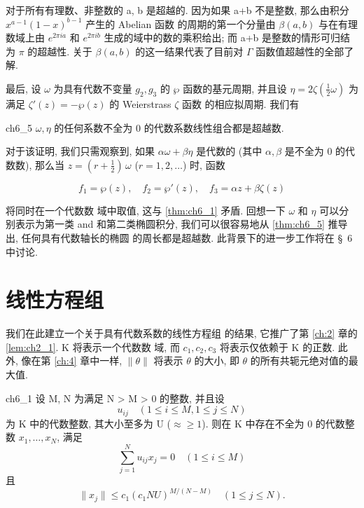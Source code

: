对于所有有理数、非整数的 a, b 是超越的. 因为如果 a+b 不是整数, 那么由积分 $x^{a-1}(1-x)^{b-1}$ 产生的 Abelian 函数 的周期的第一个分量由 $\beta(a,b)$ 与在有理数域上由 $e^{2\pi ia}$ 和 $e^{2\pi ib}$ 生成的域中的数的乘积给出; 而 a+b 是整数的情形可归结为 $\pi$ 的超越性. 关于 $\beta(a,b)$ 的这一结果代表了目前对 $\Gamma$ 函数值超越性的全部了解.

最后, 设 $\omega$ 为具有代数不变量 $g_2, g_3$ 的 $\wp$ 函数的基元周期, 并且设 $\eta = 2\zeta(\frac{1}{2}\omega)$ 为满足 $\zeta'(z) = -\wp(z)$ 的 Weierstrass $\zeta$ 函数 的相应拟周期. 我们有

\begin{mythm}{}{ch6_5}
$\omega, \eta$ 的任何系数不全为 0 的代数系数线性组合都是超越数.
\end{mythm}

对于该证明, 我们只需观察到, 如果 $\alpha\omega + \beta\eta$ 是代数的 (其中 $\alpha, \beta$ 是不全为 0 的代数数), 那么当 $z=(r+\frac{1}{2})\,\omega$ ($r=1,2,\dots$) 时, 函数

\[f_1 = \wp(z), \quad f_2 = \wp'(z), \quad f_3 = \alpha z + \beta \zeta(z)\]

将同时在一个代数数 域中取值, 这与 \autoref{thm:ch6_1} 矛盾. 回想一下 $\omega$ 和 $\eta$ 可以分别表示为第一类 and 和第二类椭圆积分, 我们可以很容易地从 \autoref{thm:ch6_5} 推导出, 任何具有代数轴长的椭圆 的周长都是超越数. 此背景下的进一步工作将在 \S~6 中讨论.

\section{线性方程组}\label{sec:ch6_3}

我们在此建立一个关于具有代数系数的线性方程组 的结果, 它推广了第 \ref{ch:2} 章的 \autoref{lem:ch2_1}. K 将表示一个代数数 域, 而 $c_1, c_2, c_3$ 将表示仅依赖于 K 的正数. 此外, 像在第 \ref{ch:4} 章中一样, $\|\theta\|$ 将表示 $\theta$ 的大小, 即 $\theta$ 的所有共轭元绝对值的最大值.

\begin{mylemma}{}{ch6_1}
设 M, N 为满足 N > M > 0 的整数, 并且设
\[u_{ij} \quad (1 \leqslant i \leqslant M, 1 \leqslant j \leqslant N)\]
为 K 中的代数整数, 其大小至多为 U ($\approx \geqslant 1$). 则在 K 中存在不全为 0 的代数整数 $x_1, \dots, x_N$, 满足
\[\sum_{j=1}^{N} u_{ij} x_j = 0 \quad (1 \leqslant i \leqslant M)\]
且
\[\|x_j\| \le c_1(c_1 N U)^{M/(N-M)} \quad (1 \le j \le N).\]
\end{mylemma}

